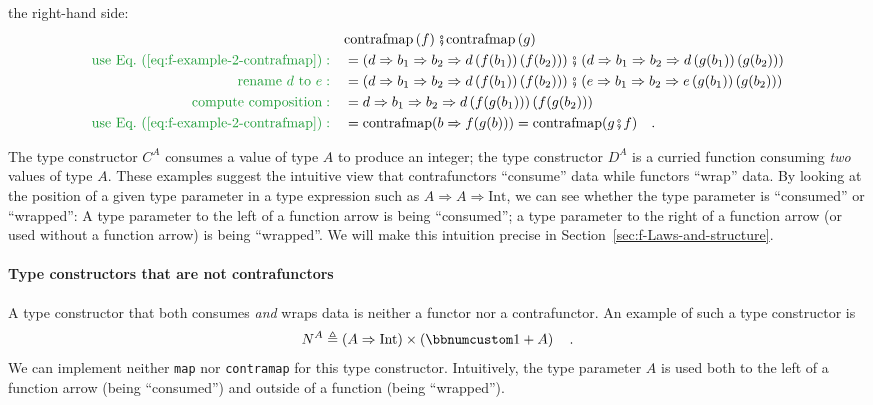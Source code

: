 the right-hand side:
\begin{align*}
 & \text{contrafmap}\left(f\right)\bef\text{contrafmap}\left(g\right)\\
{\color{greenunder}\text{use Eq.~(\ref{eq:f-example-2-contrafmap})}:}\quad & =\left(d\Rightarrow b_{1}\Rightarrow b_{2}\Rightarrow d\left(f(b_{1})\right)\left(f(b_{2})\right)\right)\bef\left(d\Rightarrow b_{1}\Rightarrow b_{2}\Rightarrow d\left(g(b_{1})\right)\left(g(b_{2})\right)\right)\\
{\color{greenunder}\text{rename }d\text{ to }e:}\quad & =\left(d\Rightarrow b_{1}\Rightarrow b_{2}\Rightarrow d\left(f(b_{1})\right)\left(f(b_{2})\right)\right)\bef\left(e\Rightarrow b_{1}\Rightarrow b_{2}\Rightarrow e\left(g(b_{1})\right)\left(g(b_{2})\right)\right)\\
{\color{greenunder}\text{compute composition}:}\quad & =d\Rightarrow b_{1}\Rightarrow b_{2}\Rightarrow d\left(f(g(b_{1}))\right)\left(f(g(b_{2}))\right)\\
{\color{greenunder}\text{use Eq.~(\ref{eq:f-example-2-contrafmap})}:}\quad & =\text{contrafmap}(b\Rightarrow f(g(b)))=\text{contrafmap}(g\bef f)\quad.
\end{align*}

The type constructor $C^{A}$ consumes a value of type $A$ to produce
an integer; the type constructor $D^{A}$ is a curried function consuming
\emph{two} values of type $A$. These examples suggest the intuitive
view that contrafunctors ``consume'' data while functors ``wrap''
data. By looking at the position of a given type parameter in a type
expression such as $A\Rightarrow A\Rightarrow\text{Int}$, we can
see whether the type parameter is ``consumed'' or ``wrapped'':
A type parameter to the left of a function arrow is being ``consumed'';
a type parameter to the right of a function arrow (or used without
a function arrow) is being ``wrapped''. We will make this intuition
precise in Section~\ref{sec:f-Laws-and-structure}.

\paragraph{Type constructors that are not contrafunctors }

A type constructor that both consumes \emph{and} wraps data is neither
a functor nor a contrafunctor. An example of such a type constructor
is
\[
N^{A}\triangleq\left(A\Rightarrow\text{Int}\right)\times\left(\bbnum 1+A\right)\quad.
\]
We can implement neither \lstinline!map! nor \lstinline!contramap!
for this type constructor. Intuitively, the type parameter $A$ is
used both to the left of a function arrow (being ``consumed'') and
outside of a function (being ``wrapped'').

